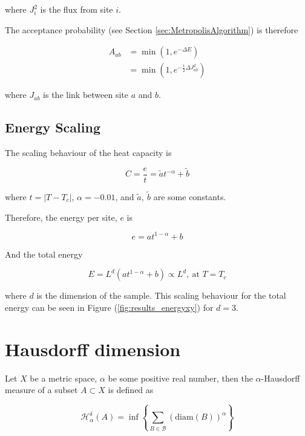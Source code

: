 where $J_i^2$ is the flux from site $i$.

The acceptance probability (see Section \ref{sec:MetropolisAlgorithm}) is therefore

\begin{align}
    A_{ab} &= \min \left ( 1, e^{-\Delta E} \right ) \\
    &= \min \left ( 1, e^{-\frac{1}{2} \Delta J_{ab}^2} \right )
\end{align}

where $J_{ab}$ is the link between site $a$ and $b$.

\subsection{Energy Scaling}
\label{subsec:xyenergyScaling}

The scaling behaviour of the heat capacity is \cite{Plischke:EqStatMech}

\begin{equation}
    C = \frac{e}{t} = \tilde a t^{-\alpha} + \tilde b
\end{equation}

where $t = |T - T_c|$, $\alpha = -0.01$, and $\tilde a, \ \tilde b$ are some constants.

Therefore, the energy per site, $e$ is

\begin{equation}
    e = a t^{1 - \alpha} + b
\end{equation}

And the total energy

\begin{equation}
    E = L^d ( a t^{1 - \alpha} + b ) \propto L^d, \ \text{at $T = T_c$}
\end{equation}

where $d$ is the dimension of the sample. This scaling behaviour for the total energy can be seen in Figure (\ref{fig:results_energyxy}) for $d = 3$.

\section{Hausdorff dimension}
\label{sec:hausdorffdimension}


Let $X$ be a metric space, $\alpha$ be some positive real number, then the $\alpha$-Hausdorff measure of a subset $A \subset X$ is defined as 

\begin{equation}
    \mathcal{H}^{\delta}_\alpha (A) = \inf \left \{ \sum_{B \in \mathcal{B}} \left ( \text{diam}(B) \right)^\alpha \right \}
\end{equation}

